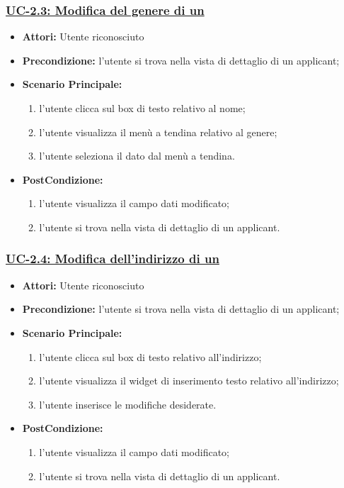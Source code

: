 \subsubsection{\underline{UC-2.3: Modifica del genere di un \applicant}}
\begin{itemize}
	\item \textbf{Attori:} Utente riconosciuto
	\item \textbf{Precondizione:}  l'utente si trova nella vista di dettaglio di un applicant;
	\item \textbf{Scenario Principale:}
	\begin{enumerate}
		\item l'utente clicca sul box di testo relativo al nome;
		\item l'utente visualizza il  menù a tendina relativo al genere;
		\item l'utente seleziona il dato dal menù a tendina.
	\end{enumerate}
	\item \textbf{PostCondizione:} 
	\begin{enumerate}
		\item l'utente visualizza il campo dati modificato;
		\item l'utente si trova nella vista di dettaglio di un applicant.
	\end{enumerate}
	
\end{itemize}

\subsubsection{\underline{UC-2.4: Modifica dell'indirizzo di un \applicant}}
\begin{itemize}
	\item \textbf{Attori:} Utente riconosciuto
	\item \textbf{Precondizione:}  l'utente si trova nella vista di dettaglio di un applicant;
	\item \textbf{Scenario Principale:}
	\begin{enumerate}
		\item l'utente clicca sul box di testo relativo all'indirizzo;
		\item l'utente visualizza il  widget di inserimento testo relativo all'indirizzo;
		\item l'utente inserisce le modifiche desiderate.
	\end{enumerate}
	\item \textbf{PostCondizione:} 
	\begin{enumerate}
		\item l'utente visualizza il campo dati modificato;
		\item l'utente si trova nella vista di dettaglio di un applicant.
	\end{enumerate}
	
\end{itemize}

